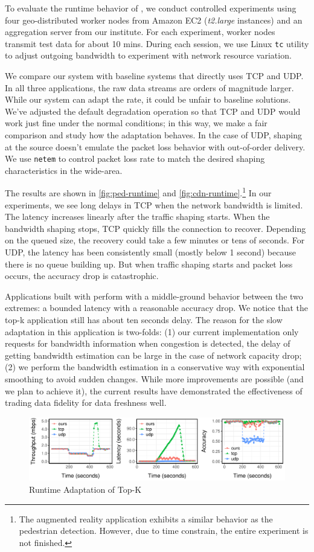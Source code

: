 To evaluate the runtime behavior of \sysname{}, we conduct controlled
experiments using four geo-distributed worker nodes from Amazon EC2
(\textit{t2.large} instances) and an aggregation server from our institute. For
each experiment, worker nodes transmit test data for about 10 mins. During each
session, we use Linux \texttt{tc} utility to adjust outgoing bandwidth to
experiment with network resource variation.

We compare our system with baseline systems that directly uses TCP and UDP. In
all three applications, the raw data streams are orders of magnitude
larger. While our system can adapt the rate, it could be unfair to baseline
solutions. We've adjusted the default degradation operation so that TCP and UDP
would work just fine under the normal conditions; in this way, we make a fair
comparison and study how the adaptation behaves. In the case of UDP, shaping at
the source doesn't emulate the packet loss behavior with out-of-order
delivery. We use \texttt{netem} to control packet loss rate to match the desired
shaping characteristics in the wide-area.

The results are shown in \autoref{fig:ped-runtime} and
\autoref{fig:cdn-runtime}.\footnote{The augmented reality application exhibits a
  similar behavior as the pedestrian detection. However, due to time constrain,
  the entire experiment is not finished.}  In our experiments, we see long
delays in TCP when the network bandwidth is limited. The latency increases
linearly after the traffic shaping starts. When the bandwidth shaping stops, TCP
quickly fills the connection to recover. Depending on the queued size, the
recovery could take a few minutes or tens of seconds. For UDP, the latency has
been consistently small (mostly below 1 second) because there is no queue
building up. But when traffic shaping starts and packet loss occurs, the
accuracy drop is catastrophic.

Applications built with \sysname{} perform with a middle-ground behavior between
the two extremes: a bounded latency with a reasonable accuracy drop. We notice
that the top-k application still has about ten seconds delay. The reason for the
slow adaptation in this application is two-folds: (1) our current implementation
only requests for bandwidth information when congestion is detected, the delay
of getting bandwidth estimation can be large in the case of network capacity
drop; (2) we perform the bandwidth estimation in a conservative way with
exponential smoothing to avoid sudden changes. While more improvements are
possible (and we plan to achieve it), the current results have demonstrated the
effectiveness of trading data fidelity for data freshness well.

\begin{figure}
  \centering
  \includegraphics[width=\textwidth]{figures/cdn-runtime-horizontal.pdf}
  \caption{Runtime Adaptation of Top-K}
  \label{fig:cdn-runtime}
\end{figure}

